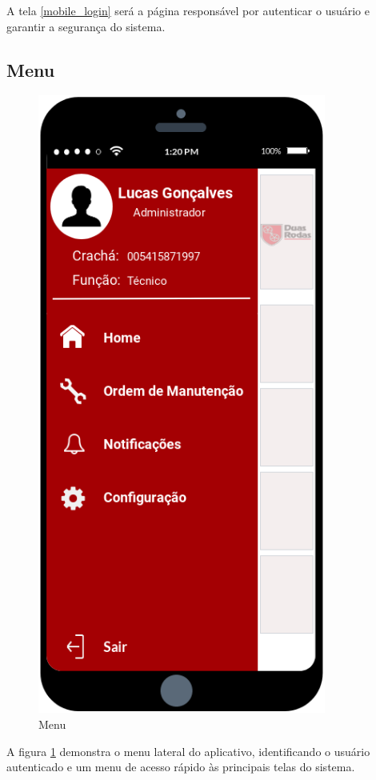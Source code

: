 A tela \ref{mobile_login} será a página responsável por autenticar o usuário e garantir a segurança do sistema.

\newpage
\subsection{Menu}

\begin{figure}[htb]
	\caption{\label{mobile_menu}Menu}
	\begin{center}
		\includegraphics[scale=0.80]{./Figuras/mobile/menu.png}
	\end{center}
\end{figure}

A figura \ref{mobile_menu} demonstra o menu lateral do aplicativo, identificando o usuário autenticado e um menu de acesso rápido às principais telas do sistema.

